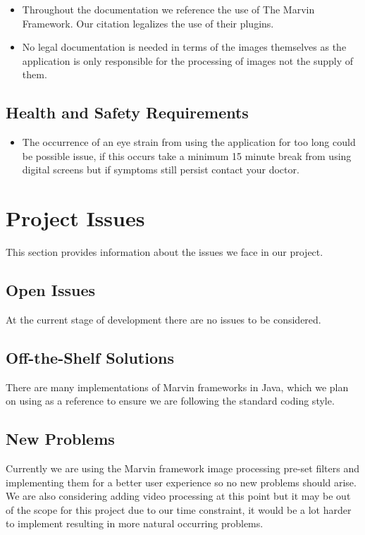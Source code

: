 \documentclass[12pt, titlepage]{article}
\begin{document}
\begin{itemize}
\item Throughout the documentation we reference the use of The Marvin Framework. Our citation legalizes the use of their plugins.
\item No legal documentation is needed in terms of the images themselves as the application is only responsible for the processing of images not the supply of them.
\end{itemize}

\subsection{Health and Safety Requirements}
\begin{itemize}
	\item  The occurrence of an eye strain from using the application for too long could be possible issue, if this occurs take a minimum 15 minute break from using digital screens but if symptoms still persist contact your doctor.
\end{itemize}


\newpage

\section{Project Issues}

This section provides information about the issues we face in our project.

\subsection{Open Issues}
At the current stage of development there are no issues to be considered.

\subsection{Off-the-Shelf Solutions}

There are many implementations of Marvin frameworks in Java, which we plan on using as a reference to ensure we are following the standard coding style.

\subsection{New Problems}

Currently we are using the Marvin framework image processing pre-set filters and implementing them for a better user experience so no new problems should arise. We are also considering adding video processing at this point but it may be out of the scope for this project due to our time constraint, it would be a lot harder to implement resulting in more natural occurring problems.
\end{document}
